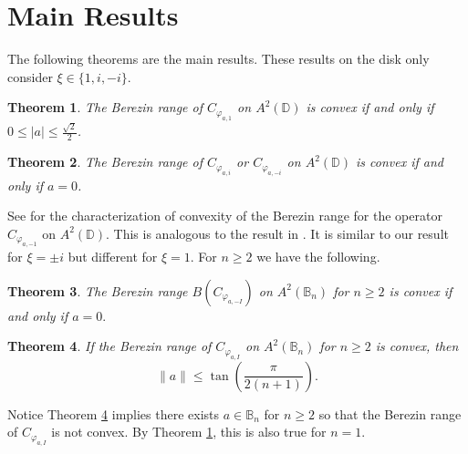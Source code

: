 \documentclass{amsart}
\newtheorem{theorem}{Theorem}
\theoremstyle{remark}
\newcommand{\B}{\mathbb{B}}
\begin{document}
\section{Main Results}
The following theorems are the main results.  These results on the disk only consider $\xi \in \{1,i,-i\}$. 
\begin{theorem}\label{MainResultOneDimension}
The Berezin range of $C_{\varphi_{a,1}}$ on $A^2(\mathbb{D})$ is convex if and only if $0\leq|a| \leq \frac{\sqrt{2}}{2}$. 
\end{theorem}
\begin{theorem}\label{mainresultonedimension3}
The Berezin range of 
$C_{\varphi_{a,i}}$ or $C_{\varphi_{a,-i}}$ on $A^2(\mathbb{D})$ is convex if and only if $a=0$.
\end{theorem}
See \cite[Theorem 5.7]{augustine2023composition} for the characterization of convexity of the Berezin range for the operator $C_{\varphi_{a,-1}}$ on $A^2(\mathbb{D})$.  This is analogous to the result in \cite[Theorem 4.5]{cowen2022convexity}.  It is similar to our result for $\xi=\pm i$ but different for $\xi=1$.  For $n\geq 2$ we have the following.
\begin{theorem}\label{Zerotonegative}
The Berezin range $B(C_{\varphi_{a,-I}})$ on $A^{2}(\B_{n})$ for $n\geq 2$ is convex if and only if $a = 0.$
\end{theorem}
\begin{theorem}\label{Zerotopositive}
If the Berezin range of $C_{\varphi_{a,I}}$ on $A^{2}(\B_{n})$ for $n\geq 2$ is convex, then \[\|a\|\leq \tan\left(\frac{\pi}{2(n+1)}\right). \]       
\end{theorem}
Notice Theorem \ref{Zerotopositive} implies there exists $a\in \mathbb{B}_n$ for $n\geq 2$ so that the Berezin range of $C_{\varphi_{a,I}}$ is not convex. By Theorem \ref{MainResultOneDimension}, this is also true for $n=1$.
\end{document}
